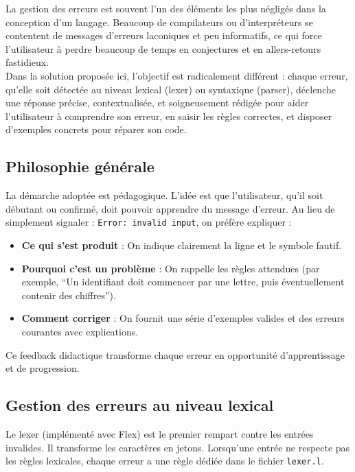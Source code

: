 \documentclass[12pt,a4paper]{article}
\begin{document}
La gestion des erreurs est souvent l’un des éléments les plus négligés dans la conception d’un langage. Beaucoup de compilateurs ou d’interpréteurs se contentent de messages d’erreurs laconiques et peu informatifs, ce qui force l’utilisateur à perdre beaucoup de temps en conjectures et en allers-retours fastidieux. \\

Dans la solution proposée ici, l’objectif est radicalement différent : chaque erreur, qu’elle soit détectée au niveau lexical (lexer) ou syntaxique (parser), déclenche une réponse précise, contextualisée, et soigneusement rédigée pour aider l’utilisateur à comprendre son erreur, en saisir les règles correctes, et disposer d’exemples concrets pour réparer son code.

\subsection{Philosophie générale}
La démarche adoptée est pédagogique. L’idée est que l’utilisateur, qu’il soit débutant ou confirmé, doit pouvoir apprendre du message d’erreur. Au lieu de simplement signaler : \texttt{Error: invalid input}, on préfère expliquer :
\begin{itemize}
    \item \textbf{Ce qui s’est produit} : On indique clairement la ligne et le symbole fautif.
    \item \textbf{Pourquoi c’est un problème} : On rappelle les règles attendues (par exemple, ``Un identifiant doit commencer par une lettre, puis éventuellement contenir des chiffres'').
    \item \textbf{Comment corriger} : On fournit une série d’exemples valides et des erreurs courantes avec explications.
\end{itemize}

Ce feedback didactique transforme chaque erreur en opportunité d’apprentissage et de progression.

\subsection{Gestion des erreurs au niveau lexical}
Le lexer (implémenté avec Flex) est le premier rempart contre les entrées invalides. Il transforme les caractères en jetons. Lorsqu’une entrée ne respecte pas les règles lexicales, chaque erreur a une règle dédiée dans le fichier \texttt{lexer.l}.
\end{document}
